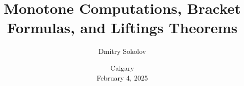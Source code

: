

\titlegraphic{
    
}


\title[]{
    Monotone Computations, Bracket Formulas, and Liftings Theorems
}

\author{
    Dmitry Sokolov
}  


\date{
    Calgary\\
    February 4, 2025
}






    \maketitle
    
    
    
    
    

